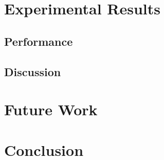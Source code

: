 \documentclass{article}
\begin{document}
\section{Experimental Results}
\subsection{Performance}
\subsection{Discussion}
\section{Future Work}
\section{Conclusion}
\end{document}
